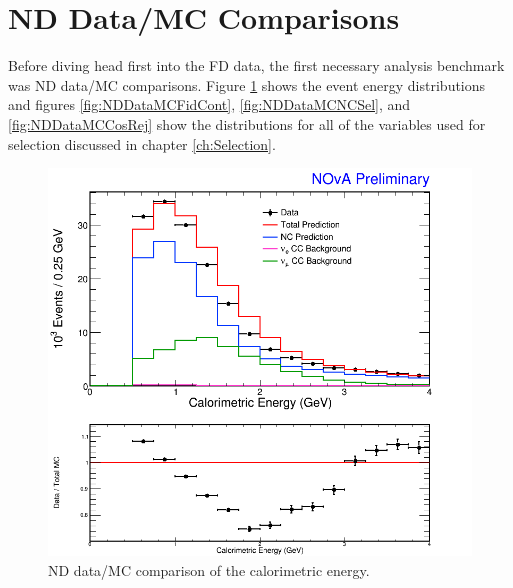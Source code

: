 \section{ND Data/MC Comparisons}
\label{sec:ResultsND}

Before diving head first into the FD data, the first necessary analysis benchmark was ND data/MC comparisons. Figure \ref{fig:NDDataMCECal} shows the event energy distributions and figures \ref{fig:NDDataMCFidCont}, \ref{fig:NDDataMCNCSel}, and \ref{fig:NDDataMCCosRej} show the distributions for all of the variables used for selection discussed in chapter \ref{ch:Selection}.
\begin{figure}[htbp]
  \centering
  \includegraphics[width=1\textwidth]{figures/NDDataMC/ECalNusNDRat.png}
  \caption[ND Data/MC Comparison: Energy Distribution]{ND data/MC comparison of the calorimetric energy.}
  \label{fig:NDDataMCECal}
\end{figure}

